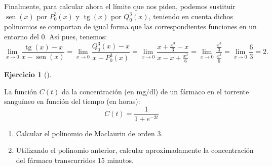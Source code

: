 \documentclass[
  spanish,
  a4paper,
]{scrreport}
\providecommand{\tightlist}{%
  \setlength{\itemsep}{0pt}\setlength{\parskip}{0pt}}
\theoremstyle{definition}
\newtheorem{exercise}{Ejercicio}[chapter]
\theoremstyle{remark}
\begin{document}
\begin{tcolorbox}
Finalmente, para calcular ahora el límite que nos piden, podemos
sustituir \(\operatorname{sen}(x)\) por \(P_{0}^{3}(x)\) y
\(\operatorname{tg}(x)\) por \(Q_{0}^{3}(x)\), teniendo en cuenta dichos
polinomios se comportan de igual forma que las correspondientes
funciones en un entorno del 0. Así pues, tenemos: \[
\lim_{x\rightarrow 0}\frac{\operatorname{tg}(x)-x}{x-\operatorname{sen}(x)} = \lim_{x\rightarrow 0}\frac{Q_{0}^{3}(x)-x}{x-P_{0}^{3}(x)} = \lim_{x\rightarrow 0}\frac{x+\frac{x^{3}}{3}-x}{x-x+\frac{x^{3}}{6}} = \lim_{x\rightarrow 0}\frac{\frac{x^{3}}{3}}{\frac{x^{3}}{6}} = \lim_{x\rightarrow 0}\frac{6}{3}=2.
\]

\end{tcolorbox}

\begin{exercise}[]\protect\hypertarget{exr-taylor-5}{}\label{exr-taylor-5}

La función \(C(t)\) da la concentración (en mg/dl) de un fármaco en el
torrente sanguíneo en función del tiempo (en horas): \[
C(t) = \frac{1}{{1 + e^{-2t}}}
\]

\begin{enumerate}
\def\labelenumi{\alph{enumi}.}
\tightlist
\item
  Calcular el polinomio de Maclaurin de orden 3.
\item
  Utilizando el polinomio anterior, calcular aproximadamente la
  concentración del fármaco transcurridos 15 minutos.
\end{enumerate}

\end{exercise}
\end{document}
